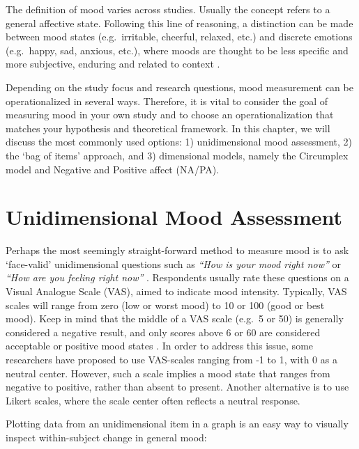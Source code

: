 \documentclass[]{book}
\begin{document}
 
 The definition of mood varies across
studies. Usually the concept refers to a general affective state.
Following this line of reasoning, a distinction can be made between mood
states (e.g.~irritable, cheerful, relaxed, etc.) and discrete emotions
(e.g.~happy, sad, anxious, etc.), where moods are thought to be less
specific and more subjective, enduring and related to context
\citep{Beedie2005, Cranford2006, Desmet2016}.

Depending on the study focus and research questions, mood measurement
can be operationalized in several ways. Therefore, it is vital to
consider the goal of measuring mood in your own study and to choose an
operationalization that matches your hypothesis and theoretical
framework. In this chapter, we will discuss the most commonly used
options: 1) unidimensional mood assessment, 2) the `bag of items'
approach, and 3) dimensional models, namely the Circumplex model and
Negative and Positive affect (NA/PA).

\section{Unidimensional Mood
Assessment}\label{unidimensional-mood-assessment}

 Perhaps the most seemingly
straight-forward method to measure mood is to ask `face-valid'
unidimensional questions such as \emph{``How is your mood right now''}
\citep{VanBallegooijen2016} or \emph{``How are you feeling right now''}
\citep{VandeVen2017}. Respondents usually rate these questions on a
Visual Analogue Scale (VAS), aimed to indicate mood intensity.
Typically, VAS scales will range from zero (low or worst mood) to 10 or
100 (good or best mood). Keep in mind that the middle of a VAS scale
(e.g.~5 or 50) is generally considered a negative result, and only
scores above 6 or 60 are considered acceptable or positive mood states
\citep{Groot2010}. In order to address this issue, some researchers have
proposed to use VAS-scales ranging from -1 to 1, with 0 as a neutral
center. However, such a scale implies a mood state that ranges from
negative to positive, rather than absent to present. Another alternative
is to use Likert scales, where the scale center often reflects a neutral
response.

Plotting data from an unidimensional item in a graph is an easy way to
visually inspect within-subject change in general mood:
\end{document}

